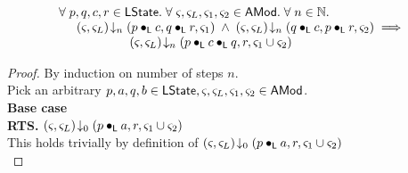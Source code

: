 %
%
\begin{lemma}[]\label{lem:amodMerge}
%
\[
\begin{array}{l}
	\forall\; p, q, c, r \in \textsf{LState}.\; \forall\; \varsigma_{}, \varsigma_{L}, \varsigma_{1}, \varsigma_{2} \in \textsf{AMod}.\; \forall\; n \in \mathbb{N}.\;\\
	\hspace*{0.5cm} \left(\varsigma_{}, \varsigma_{L}\right) \!\downarrow_{n} \left(p \bullet_{\textsf{L}} c, q \bullet_{\textsf{L}} r, \varsigma_{1}\right) \;\land\; \left(\varsigma_{}, \varsigma_{L}\right) \!\downarrow_{n} \left(q \bullet_{\textsf{L}} c, p \bullet_{\textsf{L}} r, \varsigma_{2}\right)
	\implies\\
	\hspace*{2cm} \left(\varsigma_{}, \varsigma_{L}\right) \!\downarrow_{n} \left(p \bullet_{\textsf{L}} c \bullet_{\textsf{L}} q, r, \varsigma_{1} \cup \varsigma_{2}\right)
\end{array}
\]
%
\begin{proof} By induction on number of steps $n$.\\
\noindent Pick an arbitrary $p, a, q, b \in \textsf{LState}, \varsigma_{}, \varsigma_{L}, \varsigma_{1}, \varsigma_{2} \in \textsf{AMod}$.\\
\noindent\textbf{Base case}\\
\textbf{RTS. }\hspace*{0.5cm}$\left(\varsigma_{}, \varsigma_{L}\right) \!\downarrow_{0} \left(p \bullet_{\textsf{L}} a, r, \varsigma_{1} \cup \varsigma_{2}\right)$\\
This holds trivially by definition of $\left(\varsigma_{}, \varsigma_{L}\right) \!\downarrow_{0} \left(p \bullet_{\textsf{L}} a, r, \varsigma_{1} \cup \varsigma_{2}\right)$\\


\end{proof}
\end{lemma}
